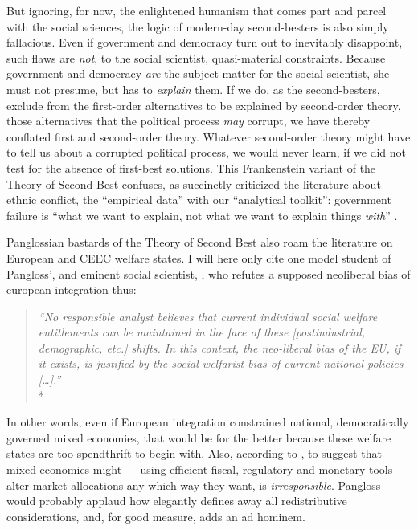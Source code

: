 But ignoring, for now, the enlightened humanism that comes part and parcel with the social sciences, the logic of modern-day second-besters is also simply fallacious.
Even if government and democracy turn out to inevitably disappoint, such flaws are \emph{not}, to the social scientist, quasi-material constraints.
Because government and democracy \emph{are} the subject matter for the social scientist, she must not presume, but has to \emph{explain} them.
If we do, as the second-besters, exclude from the first-order alternatives to be explained by second-order theory, those alternatives that the political process \emph{may} corrupt, we have thereby conflated first and second-order theory.
Whatever second-order theory might have to tell us about a corrupted political process, we would never learn, if we did not test for the absence of first-best solutions.
This Frankenstein variant of the Theory of Second Best confuses, as \cite{Brubaker-2002-aa} succinctly criticized the literature about ethnic conflict, the ``empirical data'' with our ``analytical toolkit'':
government failure is ``what we want to explain, not what we want to explain things \emph{with}'' \citeyearpar[165, emphasis in original]{Brubaker-2002-aa}.

Panglossian bastards of the Theory of Second Best also roam the literature on European and \gls{CEEC} welfare states.
I will here only cite one model student of Pangloss', and eminent social scientist, \citeauthor{Moravcsik-2002-aa}, who refutes a supposed neoliberal bias of european integration thus:
\begin{quote}
	\emph{``No responsible analyst believes that current individual social welfare entitlements can be maintained in the face of these [postindustrial, demographic, etc.] shifts.
	In this context, the neo-liberal bias of the \gls{EU}, if it exists, is justified by the social welfarist bias of current national policies [\ldots].''}
	\\*
	--- \citet[618]{Moravcsik-2002-aa}
\end{quote}
In other words, even if European integration constrained national, democratically governed mixed economies, that would be for the better because these welfare states are too spendthrift to begin with.
Also, according to \citeauthor{Moravcsik-2002-aa}, to suggest that mixed economies might --- using efficient fiscal, regulatory and monetary tools --- alter market allocations any which way they want, is \emph{irresponsible}.
Pangloss would probably applaud how elegantly \citeauthor{Moravcsik-2002-aa} defines away all redistributive considerations, and, for good measure, adds an ad hominem.


